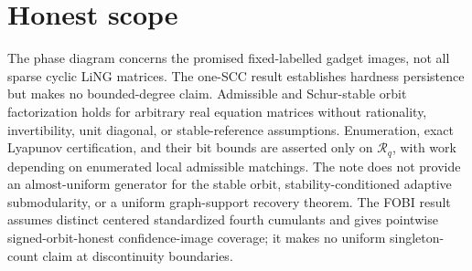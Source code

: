 \documentclass{article}
\begin{document}
\section{Honest scope}

The phase diagram concerns the promised fixed-labelled gadget images, not all sparse cyclic LiNG matrices. The one-SCC result establishes hardness persistence but makes no bounded-degree claim. Admissible and Schur-stable orbit factorization holds for arbitrary real equation matrices without rationality, invertibility, unit diagonal, or stable-reference assumptions. Enumeration, exact Lyapunov certification, and their bit bounds are asserted only on \(\mathcal R_q\), with work depending on enumerated local admissible matchings. The note does not provide an almost-uniform generator for the stable orbit, stability-conditioned adaptive submodularity, or a uniform graph-support recovery theorem. The FOBI result assumes distinct centered standardized fourth cumulants and gives pointwise signed-orbit-honest confidence-image coverage; it makes no uniform singleton-count claim at discontinuity boundaries.
\end{document}
